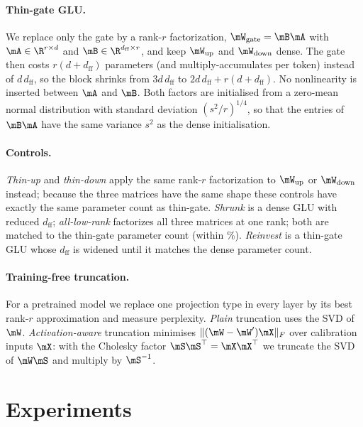 \documentclass{article}
\begin{document}
\paragraph{Thin-gate GLU.} We replace only the gate by a rank-$r$ factorization,
$\mW_{\mathrm{gate}} = \mB \mA$ with $\mA \in \R^{r \times d}$ and $\mB \in \R^{d_{\mathrm{ff}} \times r}$,
and keep $\mW_{\mathrm{up}}$ and $\mW_{\mathrm{down}}$ dense. The gate then costs $r(d + d_{\mathrm{ff}})$
parameters (and multiply-accumulates per token) instead of $d\,d_{\mathrm{ff}}$, so the block shrinks from
$3 d\, d_{\mathrm{ff}}$ to $2 d\, d_{\mathrm{ff}} + r (d + d_{\mathrm{ff}})$. No nonlinearity is inserted between
$\mA$ and $\mB$. Both factors are initialised from a zero-mean normal distribution with standard deviation
$(s^2 / r)^{1/4}$, so that the entries of $\mB\mA$ have the same variance $s^2$ as the dense initialisation.

\paragraph{Controls.} \emph{Thin-up} and \emph{thin-down} apply the same rank-$r$ factorization to
$\mW_{\mathrm{up}}$ or $\mW_{\mathrm{down}}$ instead; because the three matrices have the same shape these
controls have exactly the same parameter count as thin-gate. \emph{Shrunk} is a dense GLU with reduced
$d_{\mathrm{ff}}$; \emph{all-low-rank} factorizes all three matrices at one rank; both are matched to the
thin-gate parameter count (within \matchGapPct\%). \emph{Reinvest} is a thin-gate GLU whose $d_{\mathrm{ff}}$ is
widened until it matches the dense parameter count.

\paragraph{Training-free truncation.} For a pretrained model we replace one projection type in every layer by
its best rank-$r$ approximation and measure perplexity. \emph{Plain} truncation uses the SVD of $\mW$.
\emph{Activation-aware} truncation minimises $\|(\mW - \mW')\mX\|_F$ over calibration inputs $\mX$: with the
Cholesky factor $\mS\mS^\top = \mX\mX^\top$ we truncate the SVD of $\mW\mS$ and multiply by $\mS^{-1}$.

\section{Experiments}
\end{document}
